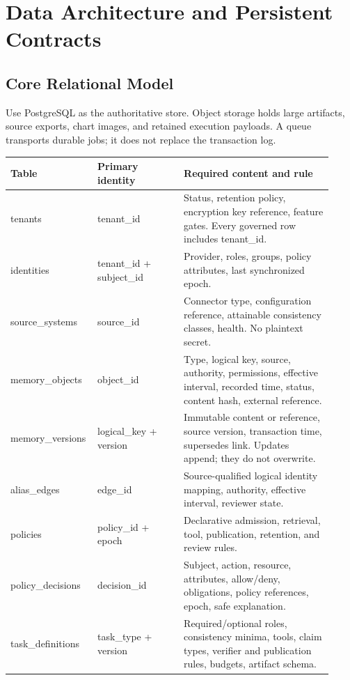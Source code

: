 \documentclass[10pt]{article}
\begin{document}
\section{Data Architecture and Persistent Contracts}

\subsection{Core Relational Model}

Use PostgreSQL as the authoritative store. Object storage holds large artifacts, source exports, chart images, and retained execution payloads. A queue transports durable jobs; it does not replace the transaction log.

\begin{longtable}{L{0.21\linewidth}L{0.26\linewidth}L{0.45\linewidth}}
\toprule
\textbf{Table} & \textbf{Primary identity} & \textbf{Required content and rule} \\
\midrule
\endhead
tenants & tenant\_id & Status, retention policy, encryption key reference, feature gates. Every governed row includes tenant\_id. \\
identities & tenant\_id + subject\_id & Provider, roles, groups, policy attributes, last synchronized epoch. \\
source\_systems & source\_id & Connector type, configuration reference, attainable consistency classes, health. No plaintext secret. \\
memory\_objects & object\_id & Type, logical key, source, authority, permissions, effective interval, recorded time, status, content hash, external reference. \\
memory\_versions & logical\_key + version & Immutable content or reference, source version, transaction time, supersedes link. Updates append; they do not overwrite. \\
alias\_edges & edge\_id & Source-qualified logical identity mapping, authority, effective interval, reviewer state. \\
policies & policy\_id + epoch & Declarative admission, retrieval, tool, publication, retention, and review rules. \\
policy\_decisions & decision\_id & Subject, action, resource, attributes, allow/deny, obligations, policy references, epoch, safe explanation. \\
task\_definitions & task\_type + version & Required/optional roles, consistency minima, tools, claim types, verifier and publication rules, budgets, artifact schema. \\

\end{longtable}
\end{document}
